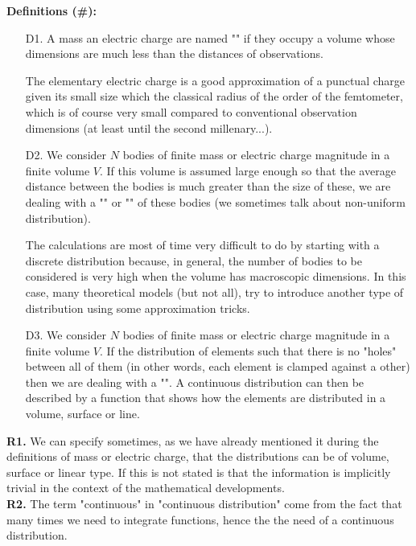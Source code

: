 	\textbf{Definitions (\#\mydef):}
	\begin{enumerate}
		\item[D1.]A mass an electric charge are named "" if they occupy a volume whose dimensions are much less than the distances of observations.
		\begin{tcolorbox}[title=Remark,colframe=black,arc=10pt]
	The elementary electric charge is a good approximation of a punctual charge given its small size which the classical radius of the order of the femtometer, which is of course very small compared to conventional observation dimensions (at least until the second millenary...).
	\end{tcolorbox}

		\item[D2.] We consider $N$ bodies of finite mass or electric charge magnitude in a finite volume $V$. If this volume is assumed large enough so that the average distance between the bodies is much greater than the size of these, we are dealing with a "" or "" of these bodies (we sometimes talk about non-uniform distribution).

		The calculations are most of time very difficult to do by starting with a discrete distribution because, in general, the number of bodies to be considered is very high when the volume has macroscopic dimensions. In this case, many theoretical models (but not all), try to introduce another type of distribution using some approximation tricks.
		
		\item[D3.] We consider $N$ bodies of finite mass or electric charge magnitude in a finite volume $V$. If the distribution of elements such that there is no "holes" between all of them (in other words, each element is clamped against a other) then we are dealing with a "". A continuous distribution can then be described by a function that shows how the elements are distributed in a volume, surface or line.
	\end{enumerate}
	\begin{tcolorbox}[title=Remarks,colframe=black,arc=10pt]
	\textbf{R1.}  We can specify sometimes, as we have already mentioned it during the definitions of mass or electric charge, that the distributions can be of volume, surface or linear type. If this is not stated is that the information is implicitly trivial in the context of the mathematical developments.\\
	
	\textbf{R2.} The term "continuous" in "continuous distribution" come from the fact that many times we need to integrate functions, hence the the need of a continuous distribution.
	\end{tcolorbox}

